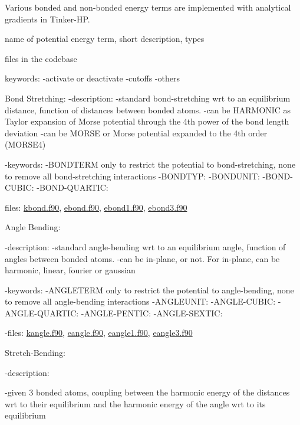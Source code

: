 Various bonded and non-\/bonded energy terms are implemented with analytical gradients in Tinker-\/\-H\-P.
\begin{DoxyItemize}
\item name of potential energy term, short description, types
\item files in the codebase
\item keywords\-: -\/activate or deactivate -\/cutoffs -\/others
\item Bond Stretching\-: -\/description\-: -\/standard bond-\/stretching wrt to an equilibrium distance, function of distances between bonded atoms. -\/can be H\-A\-R\-M\-O\-N\-I\-C as Taylor expansion of Morse potential through the 4th power of the bond length deviation -\/can be M\-O\-R\-S\-E or Morse potential expanded to the 4th order (M\-O\-R\-S\-E4)

-\/keywords\-: -\/\-B\-O\-N\-D\-T\-E\-R\-M only to restrict the potential to bond-\/stretching, none to remove all bond-\/stretching interactions -\/\-B\-O\-N\-D\-T\-Y\-P\-: -\/\-B\-O\-N\-D\-U\-N\-I\-T\-: -\/\-B\-O\-N\-D-\/\-C\-U\-B\-I\-C\-: -\/\-B\-O\-N\-D-\/\-Q\-U\-A\-R\-T\-I\-C\-:
\begin{DoxyItemize}
\item files\-: \hyperlink{kbond_8f90}{kbond.\-f90}, \hyperlink{ebond_8f90}{ebond.\-f90}, \hyperlink{ebond1_8f90}{ebond1.\-f90}, \hyperlink{ebond3_8f90}{ebond3.\-f90}
\end{DoxyItemize}
\item Angle Bending\-:

-\/description\-: -\/standard angle-\/bending wrt to an equilibrium angle, function of angles between bonded atoms. -\/can be in-\/plane, or not. For in-\/plane, can be harmonic, linear, fourier or gaussian

-\/keywords\-: -\/\-A\-N\-G\-L\-E\-T\-E\-R\-M only to restrict the potential to angle-\/bending, none to remove all angle-\/bending interactions -\/\-A\-N\-G\-L\-E\-U\-N\-I\-T\-: -\/\-A\-N\-G\-L\-E-\/\-C\-U\-B\-I\-C\-: -\/\-A\-N\-G\-L\-E-\/\-Q\-U\-A\-R\-T\-I\-C\-: -\/\-A\-N\-G\-L\-E-\/\-P\-E\-N\-T\-I\-C\-: -\/\-A\-N\-G\-L\-E-\/\-S\-E\-X\-T\-I\-C\-:

-\/files\-: \hyperlink{kangle_8f90}{kangle.\-f90}, \hyperlink{eangle_8f90}{eangle.\-f90}, \hyperlink{eangle1_8f90}{eangle1.\-f90}, \hyperlink{eangle3_8f90}{eangle3.\-f90}
\item Stretch-\/\-Bending\-:

-\/description\-:

-\/given 3 bonded atoms, coupling between the harmonic energy of the distances wrt to their equilibrium and the harmonic energy of the angle wrt to its equilibrium


\end{DoxyItemize}
